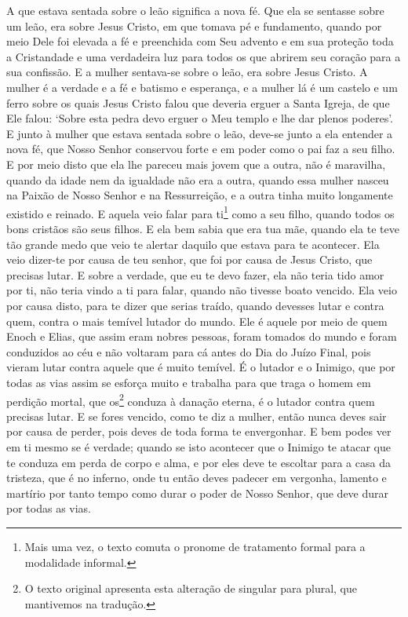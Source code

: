 A que estava sentada sobre o leão significa a nova fé. Que ela se sentasse
sobre um leão, era sobre Jesus Cristo, em que tomava pé e fundamento, quando
por meio Dele foi elevada a fé e preenchida com Seu advento e em sua proteção
toda a Cristandade e uma verdadeira luz para todos os que abrirem seu coração
para a sua confissão. E a mulher sentava-se sobre o leão,  era sobre Jesus
Cristo. A mulher é a verdade e a fé e batismo e esperança, e a mulher lá é um
castelo e um ferro sobre os quais Jesus Cristo falou que deveria erguer a Santa
Igreja, de que Ele falou: ‘Sobre esta pedra devo erguer o Meu templo e lhe dar
plenos poderes’. E junto à mulher que estava sentada sobre o leão, deve-se
junto a ela entender a nova fé, que Nosso Senhor conservou forte e em poder
como o pai faz a seu filho. E por meio disto que ela lhe pareceu mais jovem que
a outra, não é maravilha, quando da idade nem da igualdade não era a outra,
quando essa mulher nasceu na Paixão de Nosso Senhor e na Ressurreição, e a
outra tinha muito longamente existido e reinado. E aquela veio falar para
ti\footnote{ Mais uma vez, o texto comuta o pronome de tratamento formal para a
modalidade informal.}  como a seu filho, quando todos os bons
cristãos são seus filhos. E ela bem sabia que era tua mãe, quando ela te teve
tão grande medo que veio te alertar daquilo que estava para te acontecer. Ela
veio dizer-te por causa de teu senhor, que foi por causa de Jesus Cristo, que
precisas lutar. E sobre a verdade, que eu te devo fazer, ela não teria tido
amor por ti, não teria vindo a ti para falar, quando não tivesse boato vencido.
Ela veio por causa disto, para te dizer que serias traído, quando devesses
lutar e contra quem, contra o mais temível lutador do mundo. Ele é aquele por
meio de quem Enoch e Elias, que assim eram nobres pessoas, foram tomados do
mundo e foram conduzidos ao céu e não voltaram para cá antes do Dia do Juízo
Final, pois vieram lutar contra aquele que é muito temível. É o lutador e o
Inimigo, que por todas as vias assim se esforça muito e trabalha para que traga
o homem em perdição mortal, que os\footnote{ O texto original apresenta esta
alteração de singular para plural, que mantivemos na tradução.} 
conduza à danação eterna, é o lutador contra quem precisas lutar. E se fores
vencido, como te diz a mulher, então nunca deves sair por causa de perder, pois
deves de toda forma te envergonhar. E bem podes ver em ti mesmo se é verdade;
quando se isto acontecer que o Inimigo te atacar que te conduza em perda de
corpo e alma, e por eles deve te escoltar para a casa da tristeza, que é no
inferno, onde tu então deves padecer em vergonha, lamento e martírio por tanto
tempo como durar o poder de Nosso Senhor, que deve durar por todas as vias.

